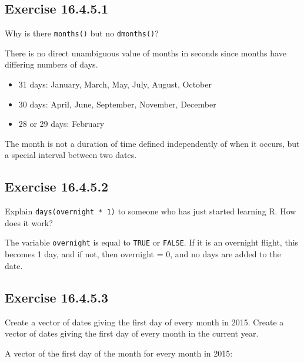 \documentclass[]{book}
\providecommand{\tightlist}{%
  \setlength{\itemsep}{0pt}\setlength{\parskip}{0pt}}
\theoremstyle{plain}
\theoremstyle{remark}
\begin{document}
\hypertarget{exercise-16.4.5.1}{%
\subsection*{\texorpdfstring{Exercise {16.4.5.1}}{Exercise 16.4.5.1}}\label{exercise-16.4.5.1}}

Why is there \texttt{months()} but no \texttt{dmonths()}?

There is no direct unambiguous value of months in seconds since months have differing numbers of days.

\begin{itemize}
\tightlist
\item
  31 days: January, March, May, July, August, October
\item
  30 days: April, June, September, November, December
\item
  28 or 29 days: February
\end{itemize}

The month is not a duration of time defined independently of when it occurs, but a special interval between two dates.

\hypertarget{exercise-16.4.5.2}{%
\subsection*{\texorpdfstring{Exercise {16.4.5.2}}{Exercise 16.4.5.2}}\label{exercise-16.4.5.2}}

Explain \texttt{days(overnight\ *\ 1)} to someone who has just started learning R. How does it work?

The variable \texttt{overnight} is equal to \texttt{TRUE} or \texttt{FALSE}.
If it is an overnight flight, this becomes 1 day, and if not, then overnight = 0, and no days are added to the date.

\hypertarget{exercise-16.4.5.3}{%
\subsection*{\texorpdfstring{Exercise {16.4.5.3}}{Exercise 16.4.5.3}}\label{exercise-16.4.5.3}}

Create a vector of dates giving the first day of every month in 2015. Create a vector of dates giving the first day of every month in the current year.

A vector of the first day of the month for every month in 2015:
\end{document}
